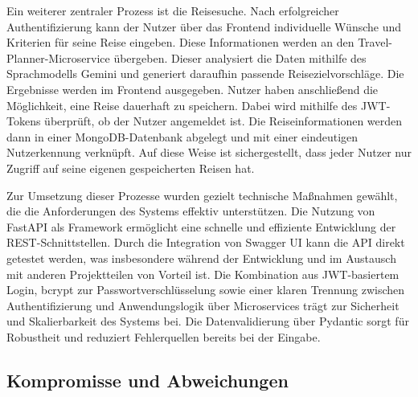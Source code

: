 Ein weiterer zentraler Prozess ist die Reisesuche. Nach erfolgreicher Authentifizierung kann der Nutzer über das Frontend individuelle Wünsche und Kriterien für seine Reise eingeben. Diese Informationen werden an den Travel-Planner-Microservice übergeben. Dieser analysiert die Daten mithilfe des Sprachmodells Gemini und generiert daraufhin passende Reisezielvorschläge. Die Ergebnisse werden im Frontend ausgegeben. Nutzer haben anschließend die Möglichkeit, eine Reise dauerhaft zu speichern. Dabei wird mithilfe des JWT-Tokens überprüft, ob der Nutzer angemeldet ist. Die Reiseinformationen werden dann in einer MongoDB-Datenbank abgelegt und mit einer eindeutigen Nutzerkennung verknüpft. Auf diese Weise ist sichergestellt, dass jeder Nutzer nur Zugriff auf seine eigenen gespeicherten Reisen hat.

Zur Umsetzung dieser Prozesse wurden gezielt technische Maßnahmen gewählt, die die Anforderungen des Systems effektiv unterstützen. Die Nutzung von FastAPI als Framework ermöglicht eine schnelle und effiziente Entwicklung der REST-Schnittstellen. Durch die Integration von Swagger UI kann die API direkt getestet werden, was insbesondere während der Entwicklung und im Austausch mit anderen Projektteilen von Vorteil ist. Die Kombination aus JWT-basiertem Login, bcrypt zur Passwortverschlüsselung sowie einer klaren Trennung zwischen Authentifizierung und Anwendungslogik über Microservices trägt zur Sicherheit und Skalierbarkeit des Systems bei. Die Datenvalidierung über Pydantic sorgt für Robustheit und reduziert Fehlerquellen bereits bei der Eingabe.

\subsection{Kompromisse und Abweichungen}
